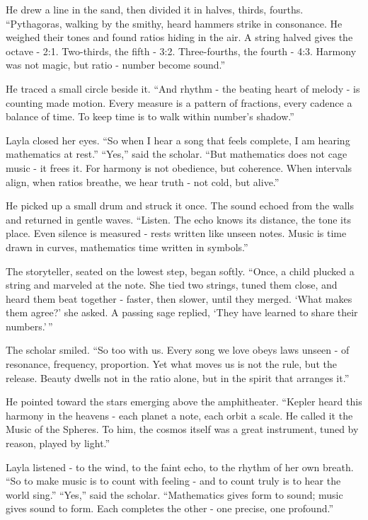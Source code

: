 \documentclass[
  letterpaper,
  DIV=11,
  numbers=noendperiod]{scrreprt}
\begin{document}
He drew a line in the sand, then divided it in halves, thirds, fourths.
``Pythagoras, walking by the smithy, heard hammers strike in consonance.
He weighed their tones and found ratios hiding in the air. A string
halved gives the octave - 2:1. Two-thirds, the fifth - 3:2.
Three-fourths, the fourth - 4:3. Harmony was not magic, but ratio -
number become sound.''

He traced a small circle beside it. ``And rhythm - the beating heart of
melody - is counting made motion. Every measure is a pattern of
fractions, every cadence a balance of time. To keep time is to walk
within number's shadow.''

Layla closed her eyes. ``So when I hear a song that feels complete, I am
hearing mathematics at rest.'' ``Yes,'' said the scholar. ``But
mathematics does not cage music - it frees it. For harmony is not
obedience, but coherence. When intervals align, when ratios breathe, we
hear truth - not cold, but alive.''

He picked up a small drum and struck it once. The sound echoed from the
walls and returned in gentle waves. ``Listen. The echo knows its
distance, the tone its place. Even silence is measured - rests written
like unseen notes. Music is time drawn in curves, mathematics time
written in symbols.''

The storyteller, seated on the lowest step, began softly. ``Once, a
child plucked a string and marveled at the note. She tied two strings,
tuned them close, and heard them beat together - faster, then slower,
until they merged. `What makes them agree?' she asked. A passing sage
replied, `They have learned to share their numbers.'\,''

The scholar smiled. ``So too with us. Every song we love obeys laws
unseen - of resonance, frequency, proportion. Yet what moves us is not
the rule, but the release. Beauty dwells not in the ratio alone, but in
the spirit that arranges it.''

He pointed toward the stars emerging above the amphitheater. ``Kepler
heard this harmony in the heavens - each planet a note, each orbit a
scale. He called it the Music of the Spheres. To him, the cosmos itself
was a great instrument, tuned by reason, played by light.''

Layla listened - to the wind, to the faint echo, to the rhythm of her
own breath. ``So to make music is to count with feeling - and to count
truly is to hear the world sing.'' ``Yes,'' said the scholar.
``Mathematics gives form to sound; music gives sound to form. Each
completes the other - one precise, one profound.''
\end{document}
